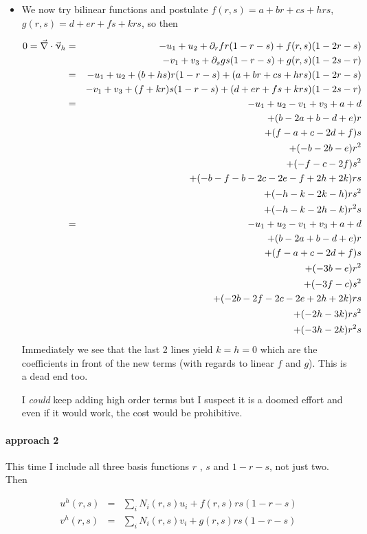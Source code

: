 \begin{itemize}
\item We now try bilinear functions and 
postulate $f(r,s)=a+br+cs+hrs$, $g(r,s)=d+er+fs+krs$, so then 

\begin{eqnarray}
0=\vec\nabla\cdot\vec\upnu_h 
&=& -u_1+u_2 + \partial_r f r(1-r-s) + f(r,s)(1-2r-s) \nonumber\\
&&  -v_1+v_3 + \partial_s g s(1-r-s) + g(r,s)(1-2s-r) \nonumber\\
&=& -u_1+u_2 + (b+hs) r(1-r-s) + (a+br+cs+hrs) (1-2r-s) \nonumber\\
&&  -v_1+v_3 + (f+kr) s(1-r-s) + (d+er+fs+krs)(1-2s-r) \nonumber\\
&=& -u_1+u_2  -v_1+v_3 + a + d \nonumber\\
&& +(b-2a+b-d+e)r \nonumber\\
&& +(f-a+c-2d+f)s \nonumber\\
&& +(-b-2b-e)r^2 \nonumber\\
&& +(-f-c-2f)s^2 \nonumber\\
&& +(-b-f-b-2c-2e-f+2h+2k)rs \nonumber\\
&& +(-h-k-2k-h)rs^2 \nonumber\\
&& +(-h-k-2h-k)r^2s \nonumber\\
&=& -u_1+u_2  -v_1+v_3 + a + d \nonumber\\
&& +(b-2a+b-d+e)r \nonumber\\
&& +(f-a+c-2d+f)s \nonumber\\
&& +(-3b-e)r^2 \nonumber\\
&& +(-3f-c)s^2 \nonumber\\
&& +(-2b-2f-2c-2e+2h+2k)rs \nonumber\\
&& +(-2h-3k)rs^2 \nonumber\\
&& +(-3h-2k)r^2s 
\end{eqnarray}
Immediately we see that the last 2 lines yield $k=h=0$ which are the coefficients 
in front of the new terms (with regards to linear $f$ and $g$). This is a dead end too. 

I {\it could} keep adding high order terms but I suspect it is a doomed effort 
and even if it would work, the cost would be prohibitive.

\end{itemize}


\paragraph{approach 2} This time I include all three basis functions $r$ , $s$ and $1-r-s$, 
not just two. Then

\begin{eqnarray}
u^h(r,s)&=&\sum_i N_i(r,s) u_i + f(r,s) rs(1-r-s) \\
v^h(r,s)&=&\sum_i N_i(r,s) v_i + g(r,s) rs(1-r-s) 
\end{eqnarray}

